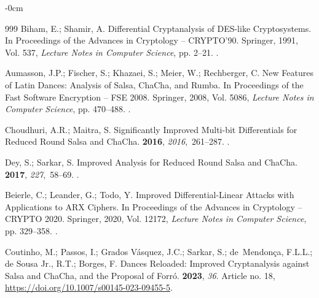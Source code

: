 \documentclass[electronics,article,submit,pdftex,oneauthor]{Definitions/mdpi}
\begin{document}
\begin{adjustwidth}{-\extralength}{0cm}
\begin{thebibliography}{999}
Biham, E.; Shamir, A.
\newblock Differential Cryptanalysis of {DES}-like Cryptosystems.
\newblock In Proceedings of the Advances in Cryptology -- {CRYPTO}'90.
  Springer,  1991, Vol. 537, {\em Lecture Notes in Computer Science}, pp.
  2--21.
.

Aumasson, J.P.; Fischer, S.; Khazaei, S.; Meier, W.; Rechberger, C.
\newblock New Features of {Latin} Dances: Analysis of {Salsa}, {ChaCha}, and
  {Rumba}.
\newblock In Proceedings of the Fast Software Encryption -- {FSE} 2008.
  Springer,  2008, Vol. 5086, {\em Lecture Notes in Computer Science}, pp.
  470--488.
.

Choudhuri, A.R.; Maitra, S.
\newblock Significantly Improved Multi-bit Differentials for Reduced Round
  {Salsa} and {ChaCha}.
 {\bf 2016}, {\em
  2016},~261--287.
.

Dey, S.; Sarkar, S.
\newblock Improved Analysis for Reduced Round {Salsa} and {ChaCha}.
 {\bf 2017}, {\em 227},~58--69.
.

Beierle, C.; Leander, G.; Todo, Y.
\newblock Improved Differential-Linear Attacks with Applications to {ARX}
  Ciphers.
\newblock In Proceedings of the Advances in Cryptology -- {CRYPTO} 2020.
  Springer,  2020, Vol. 12172, {\em Lecture Notes in Computer Science}, pp.
  329--358.
.

Coutinho, M.; Passos, I.; {Grados V{\'a}squez}, J.C.; Sarkar, S.;
  de~Mendon{\c{c}}a, F.L.L.; {de Sousa Jr.}, R.T.; Borges, F.
 Dances Reloaded: Improved Cryptanalysis against {Salsa} and
  {ChaCha}, and the Proposal of {Forr{\'o}}.
 {\bf 2023}, {\em 36}.
\newblock Article no. 18, {\url{https://doi.org/10.1007/s00145-023-09455-5}}.


\end{thebibliography}
\end{adjustwidth}
\end{document}
